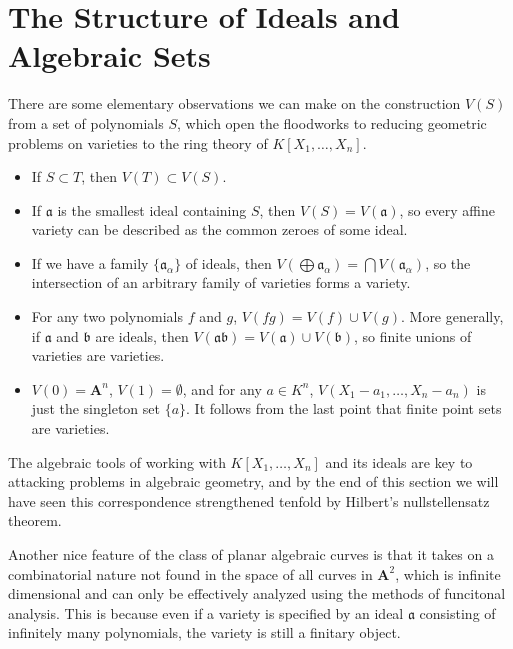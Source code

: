 \section{The Structure of Ideals and Algebraic Sets}

There are some elementary observations we can make on the construction $V(S)$ from a set of polynomials $S$, which open the floodworks to reducing geometric problems on varieties to the ring theory of $K[X_1, \dots, X_n]$.
%
\begin{itemize}
    \item If $S \subset T$, then $V(T) \subset V(S)$.

    \item If $\mathfrak{a}$ is the smallest ideal containing $S$, then $V(S) = V(\mathfrak{a})$, so every affine variety can be described as the common zeroes of some ideal.

    \item If we have a family $\{ \mathfrak{a}_\alpha \}$ of ideals, then $V(\bigoplus \mathfrak{a}_\alpha) = \bigcap V(\mathfrak{a}_\alpha)$, so the intersection of an arbitrary family of varieties forms a variety.

    \item For any two polynomials $f$ and $g$, $V(fg) = V(f) \cup V(g)$. More generally, if $\mathfrak{a}$ and $\mathfrak{b}$ are ideals, then $V(\mathfrak{a}\mathfrak{b}) = V(\mathfrak{a}) \cup V(\mathfrak{b})$, so finite unions of varieties are varieties.

    \item $V(0) = \mathbf{A}^n$, $V(1) = \emptyset$, and for any $a \in K^n$, $V(X_1-a_1,\dots,X_n - a_n)$ is just the singleton set $\{ a \}$. It follows from the last point that finite point sets are varieties.
\end{itemize}
%
The algebraic tools of working with $K[X_1, \dots, X_n]$ and its ideals are key to attacking problems in algebraic geometry, and by the end of this section we will have seen this correspondence strengthened tenfold by Hilbert's nullstellensatz theorem.

Another nice feature of the class of planar algebraic curves is that it takes on a combinatorial nature not found in the space of all curves in $\mathbf{A}^2$, which is infinite dimensional and can only be effectively analyzed using the methods of funcitonal analysis. This is because even if a variety is specified by an ideal $\mathfrak{a}$ consisting of infinitely many polynomials, the variety is still a finitary object.

